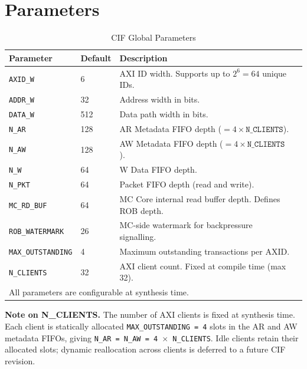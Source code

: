 \documentclass[11pt, a4paper]{article}
\begin{document}
\section{Parameters}

\begin{table}[h]
\centering
\begin{tabular}{llll}
\toprule
\textbf{Parameter} & \textbf{Default} & \textbf{Description} \\
\midrule
\texttt{AXID\_W}         & 6     & AXI ID width. Supports up to $2^6 = 64$ unique IDs. \\
\texttt{ADDR\_W}         & 32    & Address width in bits. \\
\texttt{DATA\_W}         & 512   & Data path width in bits. \\
\texttt{N\_AR}           & 128   & AR Metadata FIFO depth ($= 4 \times \texttt{N\_CLIENTS}$). \\
\texttt{N\_AW}           & 128   & AW Metadata FIFO depth ($= 4 \times \texttt{N\_CLIENTS}$). \\
\texttt{N\_W}            & 64    & W Data FIFO depth. \\
\texttt{N\_PKT}          & 64    & Packet FIFO depth (read and write). \\
\texttt{MC\_RD\_BUF}     & 64    & MC Core internal read buffer depth. Defines ROB depth. \\
\texttt{ROB\_WATERMARK}  & 26    & MC-side watermark for backpressure signalling. \\
\texttt{MAX\_OUTSTANDING}& 4     & Maximum outstanding transactions per AXID. \\
\texttt{N\_CLIENTS}      & 32    & AXI client count. Fixed at compile time (max 32). \\
\midrule
\multicolumn{3}{l}{\small All parameters are configurable at synthesis time.} \\
\bottomrule
\end{tabular}
\caption{CIF Global Parameters}
\end{table}

\textbf{Note on N\_CLIENTS.} The number of AXI clients is fixed at synthesis time. Each client is statically allocated \texttt{MAX\_OUTSTANDING = 4} slots in the AR and AW metadata FIFOs, giving \texttt{N\_AR = N\_AW = 4 $\times$ N\_CLIENTS}. Idle clients retain their allocated slots; dynamic reallocation across clients is deferred to a future CIF revision.

\end{document}
